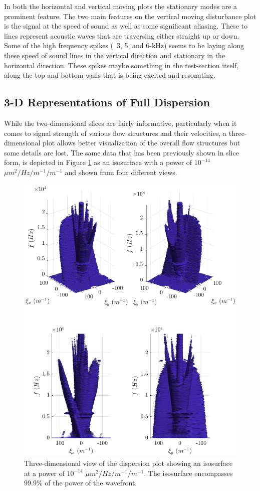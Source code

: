 In both the horizontal and vertical moving plots the stationary modes are a prominent feature.
The two main features on the vertical moving disturbance plot is the signal at the speed of sound as well as some significant aliasing.
These to lines represent acoustic waves that are traversing either straight up or down.
Some of the high frequency spikes (~3, 5, and 6-kHz) seems to be laying along these speed of sound lines in the vertical direction and stationary in the horizontal direction.
These spikes maybe something in the test-section itself, along the top and bottom walls that is being excited and resonating.

\subsection{3-D Representations of Full Dispersion}
While the two-dimensional slices are fairly informative, particularly when it comes to signal strength of various flow structures and their velocities, a three-dimensional plot allows better visualization of the overall flow structures but some details are lost.
The same data that has been previously shown in slice form, is depicted in Figure \ref{fig:04_dispersion_3d} as an isosurface with a power of $10^{-14}$ $\mu m^2/Hz/m^{-1}/m^{-1}$ and shown from four different views.
\begin{figure}
  \centering
  \includegraphics{../matlab/04_dispersion_analysis/dispersion_3d.eps}
  \caption{Three-dimensional view of the dispersion plot showing an isosurface at a power of $10^{-14}$ $\mu m^2/Hz/m^{-1}/m^{-1}$. The isosurface encompasses 99.9\% of the power of the wavefront.}
  \label{fig:04_dispersion_3d}
\end{figure}
